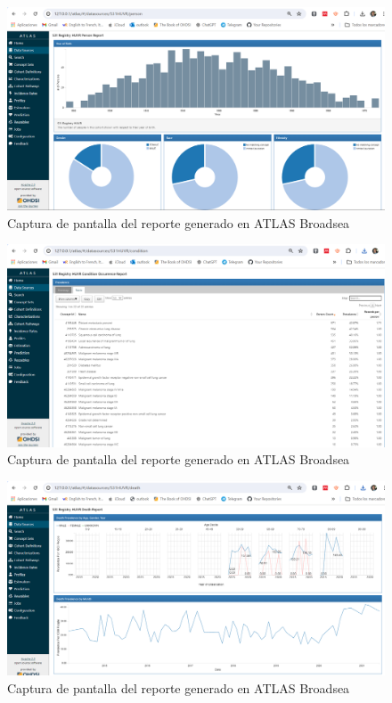 \begin{figure}[H]
    \centering
    \includegraphics[width=1\textwidth]{figures/atlasREPORTperson.png}
    \caption{Captura de pantalla del reporte  generado en ATLAS Broadsea}
    \label{figure:atlasREPORTperson}
\end{figure}

\begin{figure}[H]
    \centering
    \includegraphics[width=1\textwidth]{figures/atlasREPORTcondition_ocurrence.png}
    \caption{Captura de pantalla del reporte  generado en ATLAS Broadsea}
    \label{figure:atlasREPORTcondition_ocurrence}
\end{figure}

\begin{figure}[H]
    \centering
    \includegraphics[width=1\textwidth]{figures/atlasREPORTdeath.png}
    \caption{Captura de pantalla del reporte  generado en ATLAS Broadsea}
    \label{figure:atlasREPORTdeath}
\end{figure}

